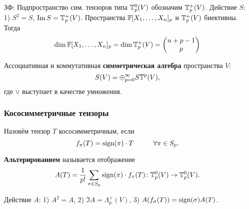 ЗФ: Подпространство сим. тензоров типа $\mathbb{T}^0_p (V)$ обозначим $\mathbb{T}^+_p (V)$.  Действие $S$: 1) $S^2 = S$, $\mathop{\mathrm{Im}}\nolimits S = \mathbb{T}^+_p (V)$. Пространства $\mathbb{F}[X_1, \dots, X_n]_p$ и $\mathbb{T}^+_p (V)$ биективны. Тогда
\begin{equation}
    \dim \mathbb{F}[X_1, \dots, X_n]_p = \dim \mathbb{T}^+_p (V) = 
    \begin{pmatrix}
        n+p-1 \\ p
    \end{pmatrix}
\end{equation}

\begin{to_def}
    Ассоциативная и коммутативная \textbf{симметрическая алгебра} пространства $V$:
    \begin{equation}
        S(V) = \oplus_{p=0}^{\infty} S\mathbb{T}^p (V),
    \end{equation}
    где $\vee$ выступает в качестве умножения.

\end{to_def}




\subsubsection{Кососимметричные тензоры}

\begin{to_def}
    Назовём тензор $T$ кососимметричным, если 
    \begin{equation}
        f_{\pi}(T) = \text{sign}(\pi) \cdot T \hspace{1cm} \forall \pi \in S_p.
    \end{equation}
\end{to_def}

\begin{to_def}
    \textbf{Альтерированием} называется отображение
    \begin{equation}
        A(T) = \frac{1}{p!} \sum_{\pi \in S_p} \text{sign}(\pi) \cdot f_{\pi} (T) \colon  \mathbb{T}^0_p (V) \to \mathbb{T}^0_p (V).
    \end{equation}
\end{to_def}


Действие $A$: 1) $A^2 = A$, 2) $\Im A = \Lambda^+_p (V)$, 3) $A(f_{\sigma}(T)) = \text{sign}(\sigma) A(T)$.





